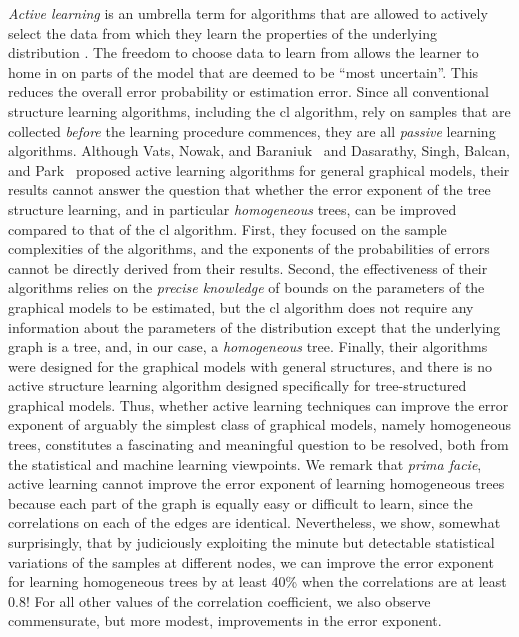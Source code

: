 {\em Active learning} is an umbrella term for   algorithms that are allowed to actively select  the data from which they learn the properties of the underlying distribution \cite{settles2009active}. The freedom to choose  data to learn from allows the learner to home in on parts of the model that are deemed to be ``most uncertain''. This    reduces the overall error probability or estimation error. Since all   conventional structure learning algorithms, including the \ac{cl} algorithm, rely on   samples that are collected {\em before} the  learning procedure commences, they are all \emph{passive} learning algorithms. Although Vats, Nowak, and Baraniuk~\cite{vats2014active} and Dasarathy, Singh, Balcan, and Park~\cite{dasarathy2016active} proposed active learning algorithms for general graphical models, their results cannot answer the question that whether the error exponent of the tree structure learning, and in particular {\em homogeneous} trees, can be improved compared to that of the \ac{cl} algorithm. First, they focused on the sample complexities of the algorithms, and the exponents of the probabilities of errors  cannot be directly derived from their results. Second, the effectiveness of their algorithms relies on the {\em precise knowledge} of bounds on the parameters of the graphical models to be estimated, but the \ac{cl} algorithm does not require any information about the parameters of the distribution except that the underlying graph is a tree, and, in our case, a {\em homogeneous} tree. Finally, their algorithms were designed  for the graphical models with general structures, and there is no active structure learning algorithm designed specifically for tree-structured graphical models. Thus, whether active learning techniques can improve the error exponent of arguably the simplest class of graphical models, namely homogeneous trees, constitutes a fascinating and meaningful question to be resolved, both from the statistical and machine learning viewpoints. We remark that {\em prima facie}, active learning cannot improve the error exponent of learning homogeneous trees because each part of the graph is equally easy or difficult to learn, since the correlations on each of the edges are identical. Nevertheless, we show, somewhat  surprisingly, that by judiciously exploiting the minute but detectable statistical variations of the samples at different nodes, we can improve the error exponent for learning homogeneous trees by at least 40\% when the correlations are at least $0.8$! For all other values of the correlation coefficient, we also observe commensurate, but more modest, improvements in the error exponent.  %


